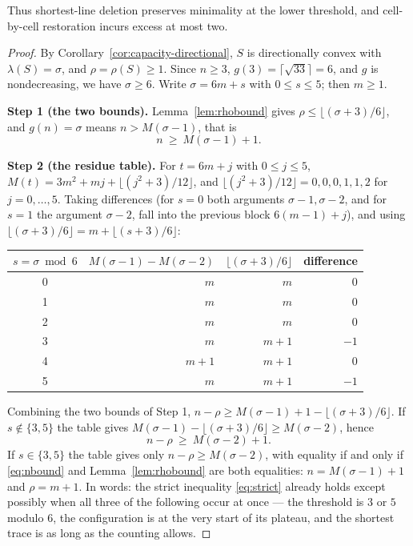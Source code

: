 \documentclass[11pt]{article}
\theoremstyle{plain}
\theoremstyle{definition}
\theoremstyle{remark}
\begin{document}
Thus shortest-line deletion preserves minimality at the lower threshold, and
cell-by-cell restoration incurs excess at most two.

\begin{proof}
By Corollary~\ref{cor:capacity-directional}, \(S\) is directionally convex with \(\lambda(S)=\sigma\),
and \(\rho=\rho(S)\ge1\). Since \(n\ge3\), \(g(3)=\lceil\sqrt{33}\rceil=6\), and \(g\) is
nondecreasing, we have \(\sigma\ge6\). Write \(\sigma=6m+s\) with \(0\le s\le5\); then
\(m\ge1\).

\medskip\noindent\textbf{Step 1 (the two bounds).}
Lemma~\ref{lem:rhobound} gives \(\rho\le\lfloor(\sigma+3)/6\rfloor\), and \(g(n)=\sigma\)
means \(n>M(\sigma-1)\), that is
\begin{equation}\label{eq:nbound}
   n\ \ge\ M(\sigma-1)+1 .
\end{equation}

\medskip\noindent\textbf{Step 2 (the residue table).}
For \(t=6m+j\) with \(0\le j\le5\), \(M(t)=3m^{2}+mj+\lfloor(j^{2}+3)/12\rfloor\), and
\(\lfloor(j^{2}+3)/12\rfloor=0,0,0,1,1,2\) for \(j=0,\dots,5\). Taking differences
(for \(s=0\) both arguments \(\sigma-1,\sigma-2\), and for \(s=1\) the argument
\(\sigma-2\), fall into the previous block \(6(m-1)+j\)), and using
\(\lfloor(\sigma+3)/6\rfloor=m+\lfloor(s+3)/6\rfloor\):

\begin{center}
\begin{tabular}{crrr}
\hline
\(s=\sigma\bmod 6\) & \(M(\sigma-1)-M(\sigma-2)\) & \(\lfloor(\sigma+3)/6\rfloor\) & difference \\
\hline
0 & \(m\)   & \(m\)   & \(0\) \\
1 & \(m\)   & \(m\)   & \(0\) \\
2 & \(m\)   & \(m\)   & \(0\) \\
3 & \(m\)   & \(m+1\) & \(-1\) \\
4 & \(m+1\) & \(m+1\) & \(0\) \\
5 & \(m\)   & \(m+1\) & \(-1\) \\
\hline
\end{tabular}
\end{center}

Combining the two bounds of Step 1,
\(n-\rho\ge M(\sigma-1)+1-\lfloor(\sigma+3)/6\rfloor\). If \(s\notin\{3,5\}\) the table
gives \(M(\sigma-1)-\lfloor(\sigma+3)/6\rfloor\ge M(\sigma-2)\), hence
\begin{equation}\label{eq:strict}
   n-\rho\ \ge\ M(\sigma-2)+1 .
\end{equation}
If \(s\in\{3,5\}\) the table gives only \(n-\rho\ge M(\sigma-2)\), with equality if and only
if \eqref{eq:nbound} and Lemma~\ref{lem:rhobound} are both equalities:
\(n=M(\sigma-1)+1\) and \(\rho=m+1\). In words: the strict inequality \eqref{eq:strict}
already holds except possibly when all three of the following occur at once --- the
threshold is \(3\) or \(5\) modulo \(6\), the configuration is at the very start of its
plateau, and the shortest trace is as long as the counting allows.


\end{proof}
\end{document}
